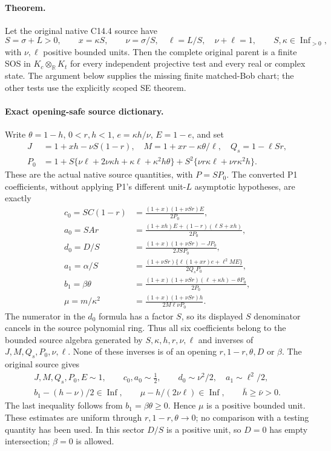 \paragraph{Theorem.}
Let the original native C14.4 source have
\[
 S=\sigma+L>0,\qquad x=\kappa S,\qquad
 \nu=\sigma/S,\quad\ell=L/S,\quad\nu+\ell=1,
 \qquad S,\kappa\in\operatorname{Inf}_{>0},
 \tag{FM1}
\]
with $\nu,\ell$ positive bounded units. Then the complete original
parent is a finite SOS in $K_c\otimes_{\mathbb R}K_t$ for every
independent projective test and every real or complex state.
The argument below supplies the missing finite matched-Bob chart;
the other tests use the explicitly scoped SE theorem.

\paragraph{Exact opening-safe source dictionary.}
Write $\theta=1-h$, $0<r,h<1$, $e=\kappa h/\nu$, $E=1-e$,
and set
\[
\begin{split}
 J&=1+xh-\nu S(1-r),\quad
 M=1+xr-\kappa\theta/\ell,\quad Q_s=1-\ell Sr,\\
 P_0&=1+S\{\nu\ell+2\nu\kappa h+\kappa\ell+
                    \kappa^2h\theta\}
             +S^2\{\nu r\kappa\ell+\nu r\kappa^2h\}.
\end{split}\tag{FM2}
\]
These are the actual native source quantities, with $P=SP_0$.
The converted P1 coefficients, without applying P1's different
unit-$L$ asymptotic hypotheses, are exactly
\[
\begin{split}
 c_0=SC(1-r)&=\frac{(1+x)(1+\nu Sr)E}{2P_0},\\
 a_0=SAr&=\frac{(1+xh)E+(1-r)(\ell S+xh)}{2P_0},\\
 d_0=D/S&=\frac{(1+x)(1+\nu Sr)-JP_0}{2JSP_0},\\
 a_1=\alpha/S&=
 \frac{(1+\nu Sr)\{\ell(1+xr)e+\ell^2ME\}}{2Q_sP_0},\\
 b_1=\beta\theta&=
 \frac{(1+x)(1+\nu Sr)(\ell+\kappa h)-\theta P_0}{2P_0},\\
 \mu=m/\kappa^2&=
 \frac{(1+x)(1+\nu Sr)h}{2M\ell\nu P_0}.
\end{split}\tag{FM3}
\]
The numerator in the $d_0$ formula has a factor $S$, so its displayed
$S$ denominator cancels in the source polynomial ring. Thus all six
coefficients belong to the bounded source algebra generated by
$S,\kappa,h,r,\nu,\ell$ and inverses of $J,M,Q_s,P_0,\nu,\ell$.
None of these inverses is of an opening $r,1-r,\theta,D$ or $\beta$.
The original source gives
\[
\begin{gathered}
 J,M,Q_s,P_0,E\sim1,\qquad c_0,a_0\sim\tfrac12,\qquad
 d_0\sim\nu^2/2,\quad a_1\sim\ell^2/2,\\
 b_1-(h-\nu)/2\in\operatorname{Inf},\qquad
 \mu-h/(2\nu\ell)\in\operatorname{Inf},\qquad
 \bar h\ge\bar\nu>0.
\end{gathered}\tag{FM4}
\]
The last inequality follows from $b_1=\beta\theta\ge0$.
Hence $\mu$ is a positive bounded unit. These estimates are uniform
through $r,1-r,\theta\to0$; no comparison with a testing quantity
has been used. In this sector $D/S$ is a positive unit, so $D=0$
has empty intersection; $\beta=0$ is allowed.

